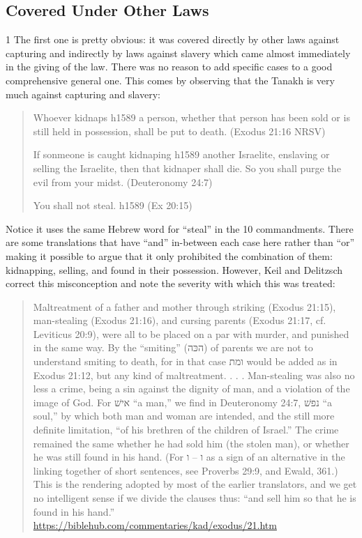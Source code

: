 \documentclass[11pt]{article}
\begin{document}
\subsection{Covered Under Other Laws}
1 The first one is pretty obvious: it was covered directly by other laws against capturing and indirectly by laws against slavery which came almost immediately in the giving of the law.
There was no reason to add specific cases to a good comprehensive general one. This comes by observing that the Tanakh is very much against capturing and slavery:
\begin{quote}
Whoever kidnaps h1589 a person, whether that person has been sold or is still held in possession, shall be put to death. (Exodus 21:16 NRSV)

If sonmeone is caught kidnaping h1589 another Israelite, enslaving or selling the Israelite, then that kidnaper shall die. So you shall purge the evil from your midst. (Deuteronomy 24:7)

You shall not steal. h1589 (Ex 20:15)
\end{quote}
Notice it uses the same Hebrew word for “steal” in the 10 commandments. There are some translations that have “and” in-between each case here rather than “or” making it possible to argue that it only prohibited the combination of them: kidnapping, selling, and found in their possession. However, Keil and Delitzsch correct this misconception and note the severity with which this was treated:
\begin{quote}
Maltreatment of a father and mother through striking (Exodus 21:15), man-stealing (Exodus 21:16), and cursing parents (Exodus 21:17, cf. Leviticus 20:9), were all to be placed on a par with murder, and punished in the same way. By the “smiting” (הכּה) of parents we are not to understand smiting to death, for in that case ומת would be added as in Exodus 21:12, but any kind of maltreatment. . . . Man-stealing was also no less a crime, being a sin against the dignity of man, and a violation of the image of God. For אישׁ “a man,” we find in Deuteronomy 24:7, נפשׁ “a soul,” by which both man and woman are intended, and the still more definite limitation, “of his brethren of the children of Israel.” The crime remained the same whether he had sold him (the stolen man), or whether he was still found in his hand. (For ו – ו as a sign of an alternative in the linking together of short sentences, see Proverbs 29:9, and Ewald, 361.) This is the rendering adopted by most of the earlier translators, and we get no intelligent sense if we divide the clauses thus: “and sell him so that he is found in his hand.” \url{https://biblehub.com/commentaries/kad/exodus/21.htm}
\end{quote}
\end{document}
